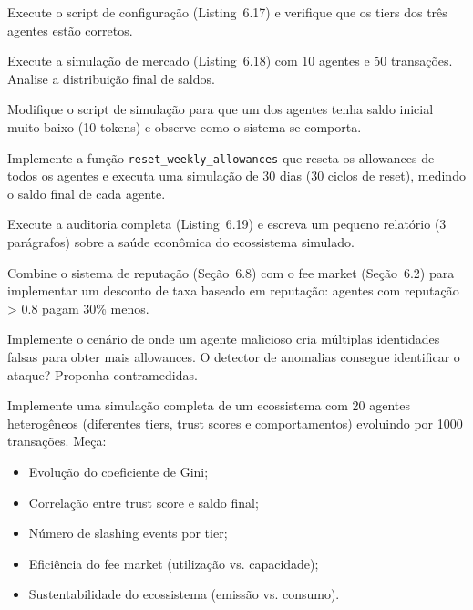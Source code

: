 \begin{exercicio}[Nivel 0]
Execute o script de configuração (Listing~6.17) e verifique que
os tiers dos três agentes estão corretos.
\end{exercicio}

\begin{exercicio}
Execute a simulação de mercado (Listing~6.18) com 10 agentes e
50 transações. Analise a distribuição final de saldos.
\end{exercicio}

\begin{exercicio}
Modifique o script de simulação para que um dos agentes tenha
saldo inicial muito baixo (10 tokens) e observe como o sistema
se comporta.
\end{exercicio}

\begin{exercicio}
Implemente a função \lstinline{reset_weekly_allowances} que
reseta os allowances de todos os agentes e executa uma simulação
de 30 dias (30 ciclos de reset), medindo o saldo final de cada
agente.
\end{exercicio}

\begin{exercicio}
Execute a auditoria completa (Listing~6.19) e escreva um
pequeno relatório (3 parágrafos) sobre a saúde econômica do
ecossistema simulado.
\end{exercicio}

\begin{exercicio}
Combine o sistema de reputação (Seção~6.8) com o fee market
(Seção~6.2) para implementar um desconto de taxa baseado em
reputação: agentes com reputação > 0.8 pagam 30\% menos.
\end{exercicio}

\begin{exercicio}
Implemente o cenário de  onde um agente
malicioso cria múltiplas identidades falsas para obter mais
allowances. O detector de anomalias consegue identificar o
ataque? Proponha contramedidas.
\end{exercicio}

\begin{exercicio}
Implemente uma simulação completa de um ecossistema com 20
agentes heterogêneos (diferentes tiers, trust scores e
comportamentos) evoluindo por 1000 transações. Meça:
\begin{itemize}
\item Evolução do coeficiente de Gini;
\item Correlação entre trust score e saldo final;
\item Número de slashing events por tier;
\item Eficiência do fee market (utilização vs. capacidade);
\item Sustentabilidade do ecossistema (emissão vs. consumo).
\end{itemize}
\end{exercicio}

